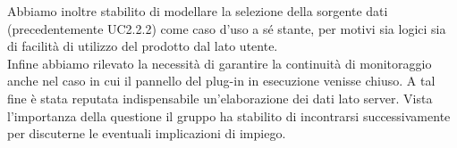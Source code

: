 Abbiamo inoltre stabilito di modellare la selezione della sorgente dati (precedentemente UC2.2.2) come caso d'uso a sé stante, per motivi sia logici sia di facilità di utilizzo del prodotto dal lato utente.\\
Infine abbiamo rilevato la necessità di garantire la continuità di monitoraggio anche nel caso in cui il pannello del plug-in in esecuzione venisse chiuso. A tal fine è stata reputata indispensabile un'elaborazione dei dati lato server. Vista l'importanza della questione il gruppo ha stabilito di incontrarsi successivamente per discuterne le eventuali implicazioni di impiego.


